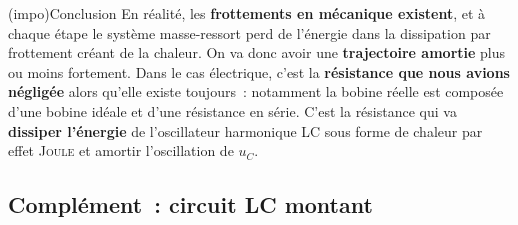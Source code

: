 \documentclass[../../main/main.tex]{subfiles}
\begin{document}
\begin{tcb}[width=\linewidth, sidebyside, righthand ratio=.4]
\begin{center}
{		}
	\end{center}
\end{tcb}

\begin{tcb}[label=impo:harmotoamorti](impo){Conclusion}
	En réalité, les \textbf{frottements en mécanique existent}, et à chaque étape
	le système masse-ressort perd de l'énergie dans la dissipation par frottement
	créant de la chaleur. On va donc avoir une \textbf{trajectoire amortie} plus
	ou moins fortement.
	\bigbreak
	Dans le cas électrique, c'est la \textbf{résistance que nous avions négligée}
	alors qu'elle existe toujours~: notamment la bobine réelle est composée d'une
	bobine idéale et d'une résistance en série. C'est la résistance qui va
	\textbf{dissiper l'énergie} de l'oscillateur harmonique LC sous forme de
	chaleur par effet \textsc{Joule} et amortir l'oscillation de $u_C$.
\end{tcb}

\subsection{Complément~: circuit LC montant}
\end{document}
